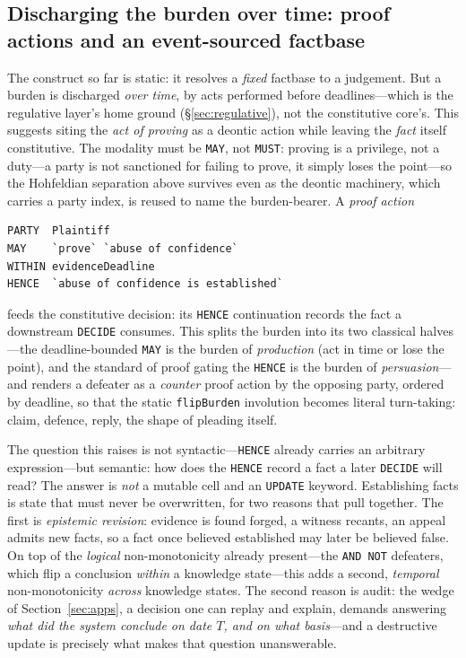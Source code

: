 \documentclass[sigconf,nonacm]{acmart}
\newcommand{\code}[1]{\texttt{\small #1}}
\begin{document}
\subsection{Discharging the burden over time: proof actions and an event-sourced factbase}\label{app:proofaction}
The construct so far is static: it resolves a \emph{fixed} factbase to a
judgement. But a burden is discharged \emph{over time}, by acts performed before
deadlines---which is the regulative layer's home ground
(\S\ref{sec:regulative}), not the constitutive core's. This suggests siting the
\emph{act of proving} as a deontic action while leaving the \emph{fact} itself
constitutive. The modality must be \code{MAY}, not \code{MUST}: proving is a
privilege, not a duty---a party is not sanctioned for failing to prove, it
simply loses the point---so the Hohfeldian separation above survives even as the
deontic machinery, which carries a party index, is reused to name the
burden-bearer. A \emph{proof action}
\begin{lstlisting}
PARTY  Plaintiff
MAY    `prove` `abuse of confidence`
WITHIN evidenceDeadline
HENCE  `abuse of confidence is established`
\end{lstlisting}
\noindent feeds the constitutive decision: its \code{HENCE} continuation records
the fact a downstream \code{DECIDE} consumes. This splits the burden into its two
classical halves---the deadline-bounded \code{MAY} is the burden of
\emph{production} (act in time or lose the point), and the standard of proof
gating the \code{HENCE} is the burden of \emph{persuasion}---and renders a
defeater as a \emph{counter} proof action by the opposing party, ordered by
deadline, so that the static \code{flipBurden} involution becomes literal
turn-taking: claim, defence, reply, the shape of pleading itself.

The question this raises is not syntactic---\code{HENCE} already carries an
arbitrary expression---but semantic: how does the \code{HENCE} record a fact a
later \code{DECIDE} will read? The answer is \emph{not} a mutable cell and an
\code{UPDATE} keyword. Establishing facts is state that must never be
overwritten, for two reasons that pull together. The first is \emph{epistemic
revision}: evidence is found forged, a witness recants, an appeal admits new
facts, so a fact once believed established may later be believed false. On top of
the \emph{logical} non-monotonicity already present---the \code{AND NOT}
defeaters, which flip a conclusion \emph{within} a knowledge state---this adds a
second, \emph{temporal} non-monotonicity \emph{across} knowledge states. The
second reason is audit: the wedge of Section~\ref{sec:apps}, a decision one can
replay and explain, demands answering \emph{what did the system conclude on date
$T$, and on what basis}---and a destructive update is precisely what makes that
question unanswerable.
\end{document}
